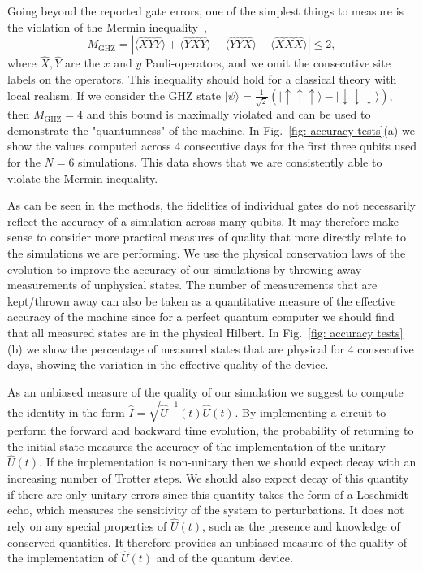 \documentclass[twocolumn,showpacs,preprintnumbers,nofootinbib,amsmath,aps,pra,longbibliography,amssymb,superscriptaddress]{revtex4-1}
\newcommand{\la}{\langle}
\newcommand{\ra}{\rangle}
\begin{document}
Going beyond the reported gate errors, one of the simplest things to measure is the violation of the Mermin inequality~\cite{Mermin1990}, 
\begin{equation}\label{eq: GHZ M}
M_\text{GHZ} = |\la \hat{X}\hat{Y}\hat{Y}\ra + \la \hat{Y}\hat{X}\hat{Y}\ra + \la \hat{Y}\hat{Y}\hat{X} \ra - \la \hat{X}\hat{X}\hat{X} \ra| \leq 2,
\end{equation}
where $\hat{X}, \hat{Y}$ are the $x$ and $y$ Pauli-operators, and we omit the consecutive site labels on the operators. This inequality should hold for a classical theory with local realism. If we consider the GHZ state $|\psi\ra = \frac{1}{\sqrt{2}}(|\!\uparrow\uparrow\uparrow\ra - |\!\downarrow\downarrow\downarrow\ra)$, then $M_\text{GHZ} = 4$ and this bound is maximally violated and can be used to demonstrate the "quantumness" of the machine. In Fig.~\ref{fig: accuracy tests}(a) we show the values computed across 4 consecutive days for the first three qubits used for the $N=6$ simulations. This data shows that we are consistently able to violate the Mermin inequality.


As can be seen in the methods, the fidelities of individual gates do not necessarily reflect the accuracy of a simulation across many qubits. It may therefore make sense to consider more practical measures of quality that more directly relate to the simulations we are performing. We use the physical conservation laws of the evolution to improve the accuracy of our simulations by throwing away measurements of unphysical states. The number of measurements that are kept/thrown away can also be taken as a quantitative measure of the effective accuracy of the machine since for a perfect quantum computer we should find that all measured states are in the physical Hilbert. In Fig.~\ref{fig: accuracy tests}(b) we show the percentage of measured states that are physical for 4 consecutive days, showing the variation in the effective quality of the device.

As an unbiased measure of the quality of our simulation we suggest to compute the identity in the form $\hat{I} = \sqrt{\hat{U}^{-1}(t) \hat{U}(t)}$. By implementing a circuit to perform the forward and backward time evolution, the probability of returning to the initial state measures the accuracy of the implementation of the unitary $\hat{U}(t)$. If the implementation is non-unitary then we should expect decay with an increasing number of Trotter steps. We should also expect decay of this quantity if there are only unitary errors since this quantity takes the form of a Loschmidt echo, which measures the sensitivity of the system to perturbations. It does not rely on any special properties of $\hat{U}(t)$, such as the presence and knowledge of conserved quantities. It therefore provides an unbiased measure of the quality of the implementation of $\hat{U}(t)$ and of the quantum device.
\end{document}
